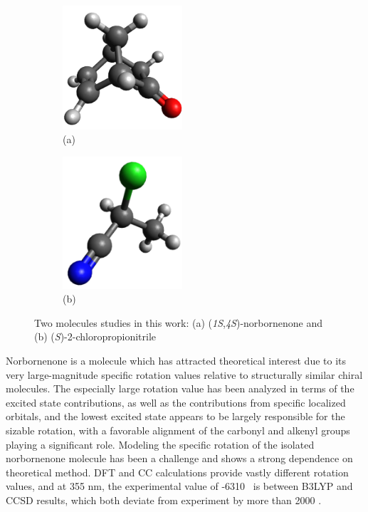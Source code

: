 \begin{figure}
\begin{subfigure}{.4\textwidth}
\hspace{0.5in}
\includegraphics[width=1.75in]{figs/fig2a.pdf}
\caption*{\hspace{1.5em}(a)}
\end{subfigure}
\hfill
\begin{subfigure}{.4\textwidth}
\includegraphics[width=1.75in]{figs/fig2b.pdf}
\caption*{\hspace{-5em}(b)}
\end{subfigure}
\caption{Two molecules studies in this work: (a) (\emph{1S},\emph{4S})-norbornenone
and (b) (\emph{S})-2-chloropropionitrile
}
\label{fig:other_molecules}
\end{figure}



Norbornenone is a molecule which has attracted theoretical interest due to
its very large-magnitude
specific rotation values relative to structurally similar chiral molecules.
\cite{Stephens:01,Ruud:03,Mach:11,Moore:12,Lahiri:13,Caricato:14}
The especially large rotation value has been analyzed in terms of the
excited state contributions\cite{Caricato:14}, as well as the contributions
from specific localized orbitals, and the lowest excited
state appears to be largely responsible for the sizable rotation,\cite{Caricato:14}
with a favorable alignment of the carbonyl and alkenyl groups playing a significant
role.\cite{Moore:12,Caricato:14} Modeling the
specific rotation of the isolated norbornenone molecule has been a challenge
and shows a strong dependence on theoretical method. DFT
\cite{Stephens:01,Ruud:03,Moore:12,Lahiri:13,Caricato:14}
and CC calculations\cite{Ruud:03,Mach:11,Lahiri:13} provide vastly
different rotation values, and at 355 nm, the experimental value of -6310
\rotunits \ is between B3LYP and CCSD results, which both deviate from
experiment by more than 2000 \rotunits.\cite{Lahiri:13}

